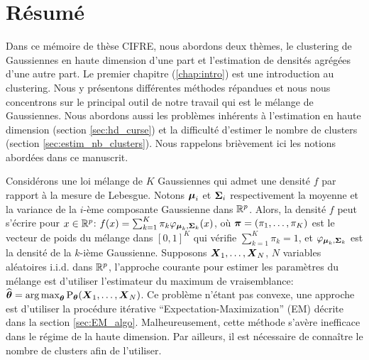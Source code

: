 \chapter*{Résumé}

Dans ce mémoire de thèse CIFRE, nous abordons deux thèmes, le clustering de Gaussiennes en haute dimension d'une part et l'estimation de densités agrégées d'une autre part. Le premier chapitre (\ref{chap:intro}) est une introduction au clustering. Nous y présentons différentes méthodes répandues et nous nous concentrons sur le principal outil de notre travail qui est le mélange de Gaussiennes. Nous abordons aussi les problèmes inhérents à l'estimation en haute dimension (section \ref{sec:hd_curse}) et la difficulté d'estimer le nombre de clusters (section \ref{sec:estim_nb_clusters}).  Nous rappelons brièvement ici les notions abordées dans ce manuscrit. 

Considérons une loi mélange de $K$ Gaussiennes qui admet une densité $f$ par rapport à la mesure de Lebesgue. Notons $\boldsymbol\mu_i$ et $\boldsymbol\Sigma_i$ respectivement la moyenne et la variance de la $i$-ème composante Gaussienne dans ${\mathbb R}^p$. Alors, la densité $f$ peut s'écrire pour $x\in{\mathbb R}^p$: $f(x)= \sum_{k=1}^K\pi_k\varphi_{\boldsymbol\mu_k,\boldsymbol\Sigma_k}(x)$, où $\boldsymbol \pi=(\pi_1,\dots,\pi_K)$ est le vecteur de poids du mélange dans $[0,1]^K$ qui vérifie $\sum_{k=1}^K\pi_k=1$, et $\varphi_{\boldsymbol\mu_k,\boldsymbol\Sigma_k}$ est la densité de la $k$-ième Gaussienne. Supposons $\boldsymbol X_1,\dots,\boldsymbol X_N$, $N$ variables aléatoires i.i.d. dans ${\mathbb R}^p$, l'approche courante pour estimer les paramètres du mélange est d'utiliser l'estimateur du maximum de vraisemblance: $\widehat{{\boldsymbol\theta}} = \operatorname*{arg\,max}_{{\boldsymbol\theta}}\textnormal{P}_{{\boldsymbol\theta}}(\boldsymbol X_1,\dots,\boldsymbol X_N)$. Ce problème n'étant pas convexe, une approche est d'utiliser la procédure itérative ``Expectation-Maximization'' (EM) décrite dans la section \ref{sec:EM_algo}. Malheureusement, cette méthode s’avère inefficace dans le régime de la haute dimension. Par ailleurs, il est nécessaire de connaître le nombre de clusters afin de l'utiliser.

